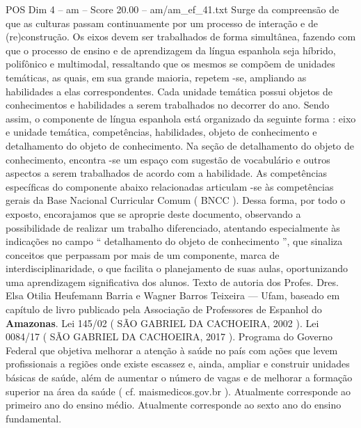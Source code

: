 \begin{textsample}{POS Dim 4 – am – Score 20.00 – am/am\_ef\_41.txt}
Surge da compreensão de que as culturas passam continuamente por um processo de interação e de (re)construção.
Os eixos devem ser trabalhados de forma simultânea, fazendo com que o processo de ensino e de aprendizagem da língua espanhola seja híbrido, polifônico e multimodal, ressaltando que os mesmos se compõem de unidades temáticas, as quais, em sua grande maioria, repetem -se, ampliando as habilidades a elas correspondentes.
Cada unidade temática possui objetos de conhecimentos e habilidades a serem trabalhados no decorrer do ano.
Sendo assim, o componente de língua espanhola está organizado da seguinte forma : eixo e unidade temática, competências, habilidades, objeto de conhecimento e detalhamento do objeto de conhecimento.
Na seção de detalhamento do objeto de conhecimento, encontra -se um espaço com sugestão de vocabulário e outros aspectos a serem trabalhados de acordo com a habilidade.
As competências específicas do componente abaixo relacionadas articulam -se às competências gerais da Base Nacional Curricular Comum ( BNCC ).
Dessa forma, por todo o exposto, encorajamos que se aproprie deste documento, observando a possibilidade de realizar um trabalho diferenciado, atentando especialmente às indicações no campo “ detalhamento do objeto de conhecimento ”, que sinaliza conceitos que perpassam por mais de um componente, marca de interdisciplinaridade, o que facilita o planejamento de suas aulas, oportunizando uma aprendizagem significativa dos alunos.
Texto de autoria dos Profes.
Dres.
Elsa Otilia Heufemann Barria e Wagner Barros Teixeira — Ufam, baseado em capítulo de livro publicado pela Associação de Professores de Espanhol do \textbf{Amazonas}.
Lei 145/02 ( SÃO GABRIEL DA CACHOEIRA, 2002 ).
Lei 0084/17 ( SÃO GABRIEL DA CACHOEIRA, 2017 ).
Programa do Governo Federal que objetiva melhorar a atenção à saúde no país com ações que levem profissionais a regiões onde existe escassez e, ainda, ampliar e construir unidades básicas de saúde, além de aumentar o número de vagas e de melhorar a formação superior na área da saúde ( cf. maismedicos.gov.br ).
Atualmente corresponde ao primeiro ano do ensino médio.
Atualmente corresponde ao sexto ano do ensino fundamental.

\end{textsample}
